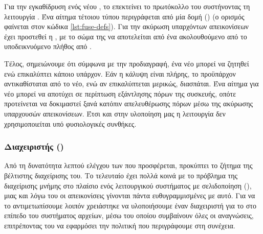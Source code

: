 Για την εγκαθίδρυση ενός νέου , το \viofs{} επεκτείνει το πρωτόκολλο
του  συστήνοντας τη λειτουργία . Ένα αίτημα
τέτοιου τύπου περιγράφεται από μία δομή ()
 (ο ορισμός φαίνεται στον κώδικα
\ref{lst:fuse-defs}). Για την ακύρωση υπαρχόντων απεικονίσεων έχει προστεθεί η
, με το σώμα της να αποτελείται από ένα  ακολουθούμενο από το υποδεικνυόμενο πλήθος από
.

Τέλος, σημειώνουμε ότι σύμφωνα με την προδιαγραφή, ένα νέο  μπορεί
να ζητηθεί ενώ επικαλύπτει κάποιο υπάρχον. Εάν η κάλυψη είναι πλήρης, το
προϋπάρχον αντικαθίσταται από το νέο, ενώ αν επικαλύπτεται μερικώς, διασπάται.
Ένα αίτημα για νέο  μπορεί να αποτύχει σε περίπτωση εξάντλησης
πόρων της συσκευής, οπότε προτείνεται να δοκιμαστεί ξανά κατόπιν απελευθέρωσης
πόρων μέσω της ακύρωσης υπαρχουσών απεικονίσεων. Έτσι και στην υλοποίηση μας η
λειτουργία  δεν χρησιμοποιείται υπό φυσιολογικές
συνθήκες.

\subsubsection{Διαχειριστής ()}

Από τη δυνατότητα λεπτού ελέγχου των  που προσφέρεται,
προκύπτει το ζήτημα της βέλτιστης διαχείρισης του. Το τελευταίο έχει πολλά κοινά
με το πρόβλημα της διαχείρισης μνήμης στο πλαίσιο ενός λειτουργικού συστήματος
με σελιδοποίηση (), μιας και λόγω του  οι
απεικονίσεις γίνονται πάντα ευθυγραμμισμένες με αυτό. Για να το αντιμετωπίσουμε
λοιπόν χρειάστηκε να υλοποιήσουμε έναν διαχειριστή για το  στο
επίπεδο του συστήματος αρχείων, μέσω του οποίου συμβαίνουν όλες οι αναγνώσεις,
επιτρέποντας του να εφαρμόσει την πολιτική που περιγράφουμε στη συνέχεια.

